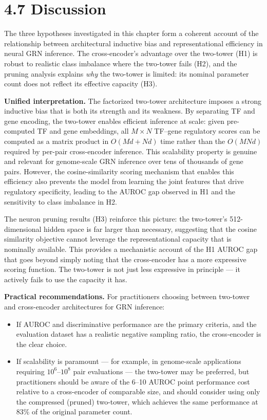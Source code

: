 \documentclass[
  12pt,
]{report}
\providecommand{\tightlist}{%
  \setlength{\itemsep}{0pt}\setlength{\parskip}{0pt}}
\begin{document}
\section{4.7 Discussion}\label{discussion}

The three hypotheses investigated in this chapter form a coherent
account of the relationship between architectural inductive bias and
representational efficiency in neural GRN inference. The cross-encoder's
advantage over the two-tower (H1) is robust to realistic class imbalance
where the two-tower fails (H2), and the pruning analysis explains
\emph{why} the two-tower is limited: its nominal parameter count does
not reflect its effective capacity (H3).

\textbf{Unified interpretation.} The factorized two-tower architecture
imposes a strong inductive bias that is both its strength and its
weakness. By separating TF and gene encoding, the two-tower enables
efficient inference at scale: given pre-computed TF and gene embeddings,
all \(M \times N\) TF--gene regulatory scores can be computed as a
matrix product in \(O(Md + Nd)\) time rather than the \(O(MNd)\)
required by per-pair cross-encoder inference. This scalability property
is genuine and relevant for genome-scale GRN inference over tens of
thousands of gene pairs. However, the cosine-similarity scoring
mechanism that enables this efficiency also prevents the model from
learning the joint features that drive regulatory specificity, leading
to the AUROC gap observed in H1 and the sensitivity to class imbalance
in H2.

The neuron pruning results (H3) reinforce this picture: the two-tower's
512-dimensional hidden space is far larger than necessary, suggesting
that the cosine similarity objective cannot leverage the
representational capacity that is nominally available. This provides a
mechanistic account of the H1 AUROC gap that goes beyond simply noting
that the cross-encoder has a more expressive scoring function. The
two-tower is not just less expressive in principle --- it actively fails
to use the capacity it has.

\textbf{Practical recommendations.} For practitioners choosing between
two-tower and cross-encoder architectures for GRN inference:

\begin{itemize}
\tightlist
\item
  If AUROC and discriminative performance are the primary criteria, and
  the evaluation dataset has a realistic negative sampling ratio, the
  cross-encoder is the clear choice.
\item
  If scalability is paramount --- for example, in genome-scale
  applications requiring \(10^6\)--\(10^8\) pair evaluations --- the
  two-tower may be preferred, but practitioners should be aware of the
  6--10 AUROC point performance cost relative to a cross-encoder of
  comparable size, and should consider using only the compressed
  (pruned) two-tower, which achieves the same performance at 83\% of the
  original parameter count.
\end{itemize}
\end{document}
